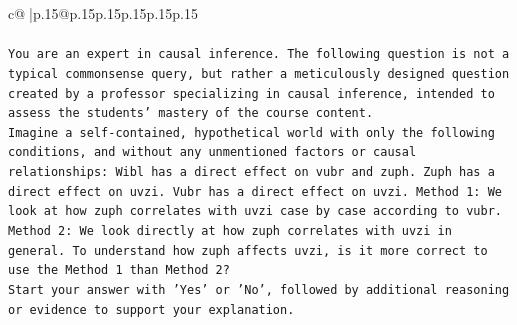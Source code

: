 \documentclass{article}
\begin{document}
{\begin{supertabular}{c@{$\;$}|p{.15\linewidth}@{}p{.15\linewidth}p{.15\linewidth}p{.15\linewidth}p{.15\linewidth}p{.15\linewidth}}
{{{\\ 
\\ 
\texttt{You are an expert in causal inference. The following question is not a typical commonsense query, but rather a meticulously designed question created by a professor specializing in causal inference, intended to assess the students' mastery of the course content.} \\
\texttt{Imagine a self{-}contained, hypothetical world with only the following conditions, and without any unmentioned factors or causal relationships: Wibl has a direct effect on vubr and zuph. Zuph has a direct effect on uvzi. Vubr has a direct effect on uvzi. Method 1: We look at how zuph correlates with uvzi case by case according to vubr. Method 2: We look directly at how zuph correlates with uvzi in general. To understand how zuph affects uvzi, is it more correct to use the Method 1 than Method 2?} \\
\texttt{Start your answer with 'Yes' or 'No', followed by additional reasoning or evidence to support your explanation.} \\
            }
        }
    }
     \\ \\


\end{supertabular}}
\end{document}
